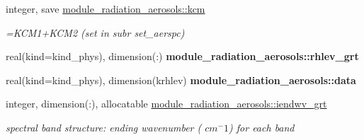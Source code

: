 \begin{DoxyCompactItemize}
\mbox{\label{group__module__radiation__aerosols_ga4816bc93b826ff2fad9ff0805ea39fd5}} 
integer, save \hyperlink{group__module__radiation__aerosols_ga4816bc93b826ff2fad9ff0805ea39fd5}{module\+\_\+radiation\+\_\+aerosols\+::kcm}
\begin{DoxyCompactList}\small\item\em =K\+C\+M1+\+K\+C\+M2 (set in subr set\+\_\+aerspc) \end{DoxyCompactList}\item 
\mbox{\label{group__module__radiation__aerosols_gace40d50e36de1fc08c4ff35f6d8dbda9}} 
real(kind=kind\+\_\+phys), dimension(\+:) {\bfseries module\+\_\+radiation\+\_\+aerosols\+::rhlev\+\_\+grt}
\item 
\mbox{\label{group__module__radiation__aerosols_ga1248e740e53498ed7a06f7d475b1fb25}} 
real(kind=kind\+\_\+phys), dimension(krhlev) {\bfseries module\+\_\+radiation\+\_\+aerosols\+::data}
\item 
\mbox{\label{group__module__radiation__aerosols_gac755c4235327053fff060ffa3b2ee2a3}} 
integer, dimension(\+:), allocatable \hyperlink{group__module__radiation__aerosols_gac755c4235327053fff060ffa3b2ee2a3}{module\+\_\+radiation\+\_\+aerosols\+::iendwv\+\_\+grt}
\begin{DoxyCompactList}\small\item\em spectral band structure\+: ending wavenumber ( $cm^-1$) for each band \end{DoxyCompactList}\end{DoxyCompactItemize}
